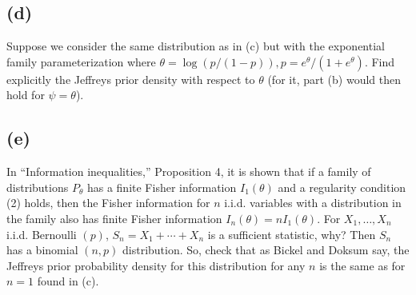 \documentclass[11pt]{article}
\newcommand{\ProbS}{\iftrue}
\newcommand{\ProbE}{\fi}
\begin{document}
\subsection*{(d)}
\ProbS
Suppose we consider the same distribution as in (c) but with the exponential family parameterization where $\theta = \log(p/(1-p)), p=e^{\theta}/(1+e^{\theta})$. Find explicitly the Jeffreys prior density with respect to $\theta$ (for it, part (b) would then hold for $\psi = \theta$).
\ProbE

\subsection*{(e)}
\ProbS
In ``Information inequalities,'' Proposition 4, it is shown that if a family of distributions $P_{\theta}$ has a finite Fisher information $I_1(\theta)$ and a regularity condition (2) holds, then the Fisher information for $n$ i.i.d. variables with a distribution in the family also has finite Fisher information $I_{n}(\theta) = nI_1(\theta)$.
For $X_1, \dots, X_n$ i.i.d. Bernoulli $(p)$, $S_n = X_1 + \cdots + X_n$ is a sufficient statistic, why?
Then $S_n$ has a binomial $(n, p)$ distribution. So, check that as Bickel and Doksum say, the Jeffreys prior probability density for this distribution for any $n$ is the same as for $n=1$ found in (c).
\ProbE
\end{document}
